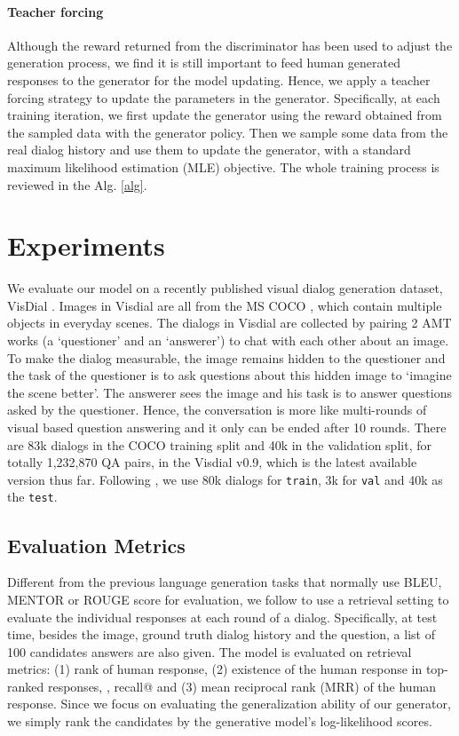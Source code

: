 \documentclass[10pt,twocolumn,letterpaper]{article}
\begin{document}
\vspace{-8pt}
\paragraph{Teacher forcing}
Although the reward returned from the discriminator has been used to adjust the generation process, we find it is still important to feed human generated responses to the generator for the model updating. Hence, we apply a teacher forcing \cite{lamb2016professor,li2017adversarial} strategy to update the parameters in the generator. Specifically, at each training iteration, we first update the generator using the reward obtained from the sampled data with the generator policy. Then we sample some data from the real dialog history and use them to update the generator, with a standard maximum likelihood estimation (MLE) objective. The whole training process is reviewed in the Alg. \ref{alg}.



 \section{Experiments}
\label{exp}
We evaluate our model on a recently published visual dialog generation dataset, VisDial \cite{das2016visual}. Images in Visdial are all from the MS COCO \cite{lin2014microsoft}, which contain multiple objects in everyday scenes. The dialogs in Visdial are collected by pairing 2 AMT works (a `questioner' and an `answerer') to chat with each other about an image. To make the dialog measurable, the image remains hidden to the questioner and the task of the questioner is to ask questions about this hidden image to ‘imagine the scene better’. The answerer sees the image and his task is to answer questions asked by the questioner. Hence, the conversation is more like multi-rounds of visual based question answering and it only can be ended after 10 rounds. There are 83k dialogs in the COCO training split and 40k in the validation split, for totally 1,232,870 QA pairs, in the Visdial v0.9, which is the latest available version thus far. Following \cite{lin2014microsoft}, we use 80k dialogs for \texttt{train}, 3k for \texttt{val} and 40k as the \texttt{test}.

\subsection{Evaluation Metrics}
Different from the previous language generation tasks that normally use BLEU, MENTOR or ROUGE score for evaluation, we follow \cite{lin2014microsoft} to use a retrieval setting to evaluate the individual responses at each round of a dialog. Specifically, at test time, besides the image, ground truth dialog history and the question, a list of 100 candidates answers are also given. The model is evaluated on retrieval metrics: (1) rank of human response, (2) existence of the human response in top- ranked responses, \ie, recall@ and (3) mean reciprocal rank (MRR) of the human response. Since we focus on evaluating the generalization ability of our generator, we simply rank the candidates by the generative model's log-likelihood scores.
\end{document}
